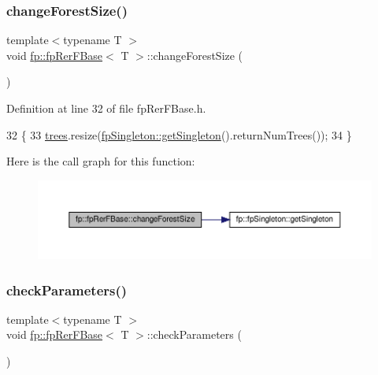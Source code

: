 \subsubsection{\texorpdfstring{change\+Forest\+Size()}{changeForestSize()}}
{\footnotesize\ttfamily template$<$typename T $>$ \\
void \hyperlink{classfp_1_1fpRerFBase}{fp\+::fp\+Rer\+F\+Base}$<$ T $>$\+::change\+Forest\+Size (\begin{DoxyParamCaption}{ }\end{DoxyParamCaption})\hspace{0.3cm}{\ttfamily [inline]}}



Definition at line 32 of file fp\+Rer\+F\+Base.\+h.


\begin{DoxyCode}
32                                    \{
33                 \hyperlink{classfp_1_1fpRerFBase_a6c2f12312e64e5234fc53741f1bfbe96}{trees}.resize(\hyperlink{classfp_1_1fpSingleton_a8bdae77b68521003e3fc630edec2e240}{fpSingleton::getSingleton}().returnNumTrees());
34             \}
\end{DoxyCode}
Here is the call graph for this function\+:
\nopagebreak
\begin{figure}[H]
\begin{center}
\leavevmode
\includegraphics[width=350pt]{classfp_1_1fpRerFBase_a4aa9be48cadab132857ea9d9da18fe8a_cgraph}
\end{center}
\end{figure}
\mbox{\label{classfp_1_1fpRerFBase_ae458c0b2743862b693ded729bf00b218}} 
\subsubsection{\texorpdfstring{check\+Parameters()}{checkParameters()}}
{\footnotesize\ttfamily template$<$typename T $>$ \\
void \hyperlink{classfp_1_1fpRerFBase}{fp\+::fp\+Rer\+F\+Base}$<$ T $>$\+::check\+Parameters (\begin{DoxyParamCaption}{ }\end{DoxyParamCaption})\hspace{0.3cm}{\ttfamily [inline]}}



